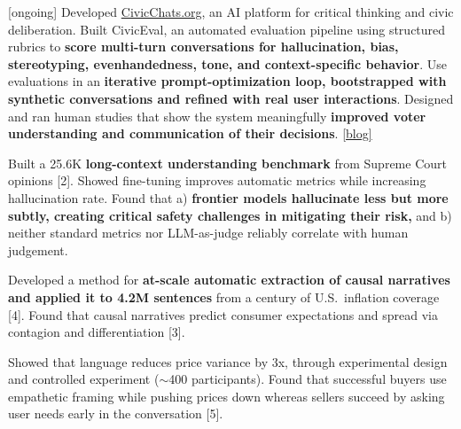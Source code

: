 \documentclass[11pt,letterpaper]{article}
\begin{document}
\begin{cvitems}
    \item {[ongoing]} Developed \href{https://civicchats.org}{CivicChats.org}, an AI platform for critical thinking and civic deliberation. Built CivicEval, an automated evaluation pipeline using structured rubrics to \textbf{score multi-turn conversations for hallucination, bias, stereotyping, evenhandedness, tone, and context-specific behavior}. Use evaluations in an \textbf{iterative prompt-optimization loop, bootstrapped with synthetic conversations and refined with real user interactions}. Designed and ran human studies that show the system meaningfully \textbf{improved voter understanding and communication of their decisions}. \href{https://open.substack.com/pub/cichicago/p/civicchats-building-ai-to-support}{[blog]}
    \item Built a 25.6K \textbf{long-context understanding benchmark} from Supreme Court opinions [2]. Showed fine-tuning improves automatic metrics while increasing hallucination rate. Found that a) \textbf{frontier models hallucinate less but more subtly, creating critical safety challenges in mitigating their risk,} and b) neither standard metrics nor LLM-as-judge reliably correlate with human judgement.
    \item Developed a method for \textbf{at-scale automatic extraction of causal narratives and applied it to 4.2M sentences} from a century of U.S.\ inflation coverage [4]. Found that causal narratives predict consumer expectations and spread via contagion and differentiation [3].
    \item Showed that language reduces price variance by 3x, through experimental design and controlled experiment ($\sim$400 participants). Found that successful buyers use empathetic framing while pushing prices down whereas sellers succeed by asking user needs early in the conversation [5].
    
\end{cvitems}
\end{document}
